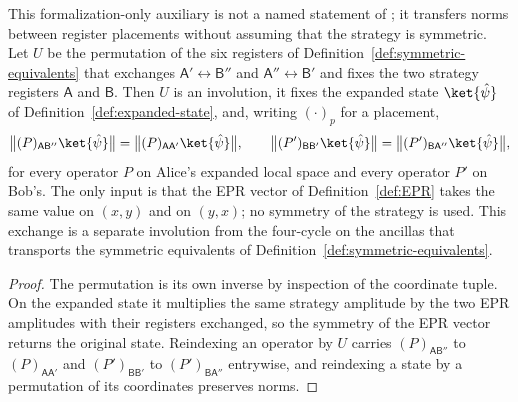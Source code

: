 \begin{lemma}
	\label{lem:qld-epr-cross-swap}
	\leanok
	This formalization-only auxiliary is not a named statement of
	\cite{Ji2020MIPStar}; it transfers norms between register placements
	without assuming that the strategy is symmetric.
	Let $U$ be the permutation of the six registers of
	Definition~\ref{def:symmetric-equivalents} that exchanges
	$\mathsf{A}' \leftrightarrow \mathsf{B}''$ and
	$\mathsf{A}'' \leftrightarrow \mathsf{B}'$ and fixes the two strategy
	registers $\mathsf{A}$ and $\mathsf{B}$. Then $U$ is an involution, it
	fixes the expanded state $\ket{\hat\psi}$ of
	Definition~\ref{def:expanded-state}, and, writing $(\cdot)_p$ for a
	placement,
	\[
		\bigl\lVert (P)_{\mathsf{A}\mathsf{B}''}\ket{\hat\psi}\bigr\rVert
		= \bigl\lVert (P)_{\mathsf{A}\mathsf{A}'}\ket{\hat\psi}\bigr\rVert,
		\qquad
		\bigl\lVert (P')_{\mathsf{B}\mathsf{B}'}\ket{\hat\psi}\bigr\rVert
		= \bigl\lVert (P')_{\mathsf{B}\mathsf{A}''}\ket{\hat\psi}\bigr\rVert,
	\]
	for every operator $P$ on Alice's expanded local space and every operator
	$P'$ on Bob's. The only input is that the EPR vector of
	Definition~\ref{def:EPR} takes the same value on $(x,y)$ and on $(y,x)$;
	no symmetry of the strategy is used. This exchange is a separate
	involution from the four-cycle on the ancillas that transports the
	symmetric equivalents of Definition~\ref{def:symmetric-equivalents}.
\end{lemma}
\begin{proof}
	\leanok
	The permutation is its own inverse by inspection of the coordinate tuple.
	On the expanded state it multiplies the same strategy amplitude by the two
	EPR amplitudes with their registers exchanged, so the symmetry of the EPR
	vector returns the original state. Reindexing an operator by $U$ carries
	$(P)_{\mathsf{A}\mathsf{B}''}$ to $(P)_{\mathsf{A}\mathsf{A}'}$ and
	$(P')_{\mathsf{B}\mathsf{B}'}$ to $(P')_{\mathsf{B}\mathsf{A}''}$
	entrywise, and reindexing a state by a permutation of its coordinates
	preserves norms.
\end{proof}

